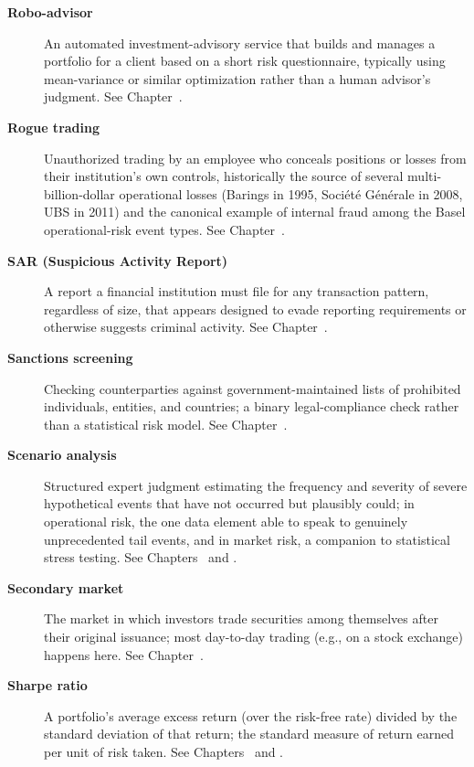 \documentclass[../ai_in_finance]{subfiles}
\begin{document}
\begin{description}
\item[\textbf{Robo-advisor}] An automated investment-advisory service that builds and manages a portfolio for a client based on a short risk questionnaire, typically using mean-variance or similar optimization rather than a human advisor's judgment. See Chapter~.

\item[\textbf{Rogue trading}] Unauthorized trading by an employee who conceals positions or losses from their institution's own controls, historically the source of several multi-billion-dollar operational losses (Barings in 1995, Soci\'et\'e G\'en\'erale in 2008, UBS in 2011) and the canonical example of internal fraud among the Basel operational-risk event types. See Chapter~.

\item[\textbf{SAR (Suspicious Activity Report)}] A report a financial institution must file for any transaction pattern, regardless of size, that appears designed to evade reporting requirements or otherwise suggests criminal activity. See Chapter~.

\item[\textbf{Sanctions screening}] Checking counterparties against government-maintained lists of prohibited individuals, entities, and countries; a binary legal-compliance check rather than a statistical risk model. See Chapter~.

\item[\textbf{Scenario analysis}] Structured expert judgment estimating the frequency and severity of severe hypothetical events that have not occurred but plausibly could; in operational risk, the one data element able to speak to genuinely unprecedented tail events, and in market risk, a companion to statistical stress testing. See Chapters~ and .

\item[\textbf{Secondary market}] The market in which investors trade securities among themselves after their original issuance; most day-to-day trading (e.g., on a stock exchange) happens here. See Chapter~.

\item[\textbf{Sharpe ratio}] A portfolio's average excess return (over the risk-free rate) divided by the standard deviation of that return; the standard measure of return earned per unit of risk taken. See Chapters~ and .


\end{description}
\end{document}
